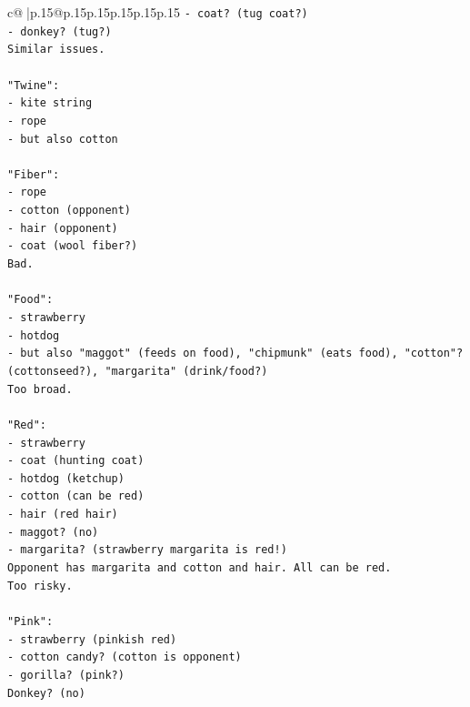 \documentclass{article}
\begin{document}
{\begin{supertabular}{c@{$\;$}|p{.15\linewidth}@{}p{.15\linewidth}p{.15\linewidth}p{.15\linewidth}p{.15\linewidth}p{.15\linewidth}}
{{{\texttt{{-} coat? (tug coat?)} \\
\texttt{{-} donkey? (tug?)} \\
\texttt{Similar issues.} \\
\\ 
\texttt{"Twine":} \\
\texttt{{-} kite string} \\
\texttt{{-} rope} \\
\texttt{{-} but also cotton} \\
\\ 
\texttt{"Fiber":} \\
\texttt{{-} rope} \\
\texttt{{-} cotton (opponent)} \\
\texttt{{-} hair (opponent)} \\
\texttt{{-} coat (wool fiber?)} \\
\texttt{Bad.} \\
\\ 
\texttt{"Food":} \\
\texttt{{-} strawberry} \\
\texttt{{-} hotdog} \\
\texttt{{-} but also "maggot" (feeds on food), "chipmunk" (eats food), "cotton"? (cottonseed?), "margarita" (drink/food?)} \\
\texttt{Too broad.} \\
\\ 
\texttt{"Red":} \\
\texttt{{-} strawberry} \\
\texttt{{-} coat (hunting coat)} \\
\texttt{{-} hotdog (ketchup)} \\
\texttt{{-} cotton (can be red)} \\
\texttt{{-} hair (red hair)} \\
\texttt{{-} maggot? (no)} \\
\texttt{{-} margarita? (strawberry margarita is red!)} \\
\texttt{Opponent has margarita and cotton and hair. All can be red.} \\
\texttt{Too risky.} \\
\\ 
\texttt{"Pink":} \\
\texttt{{-} strawberry (pinkish red)} \\
\texttt{{-} cotton candy? (cotton is opponent)} \\
\texttt{{-} gorilla? (pink?)} \\
\texttt{Donkey? (no)} \\
}}}
\end{supertabular}}
\end{document}
